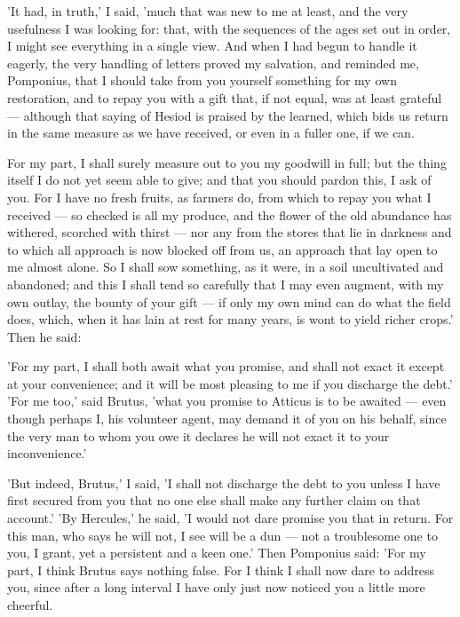  'It had, in truth,' I said, 'much that was new to me at least, and the very usefulness I was looking for: that, with the sequences of the ages set out in order, I might see everything in a single view. And when I had begun to handle it eagerly, the very handling of letters proved my salvation, and reminded me, Pomponius, that I should take from you yourself something for my own restoration, and to repay you with a gift that, if not equal, was at least grateful — although that saying of Hesiod is praised by the learned, which bids us return in the same measure as we have received, or even in a fuller one, if we can.

 For my part, I shall surely measure out to you my goodwill in full; but the thing itself I do not yet seem able to give; and that you should pardon this, I ask of you. For I have no fresh fruits, as farmers do, from which to repay you what I received — so checked is all my produce, and the flower of the old abundance has withered, scorched with thirst — nor any from the stores that lie in darkness and to which all approach is now blocked off from us, an approach that lay open to me almost alone. So I shall sow something, as it were, in a soil uncultivated and abandoned; and this I shall tend so carefully that I may even augment, with my own outlay, the bounty of your gift — if only my own mind can do what the field does, which, when it has lain at rest for many years, is wont to yield richer crops.' Then he said:

 'For my part, I shall both await what you promise, and shall not exact it except at your convenience; and it will be most pleasing to me if you discharge the debt.' 'For me too,' said Brutus, 'what you promise to Atticus is to be awaited — even though perhaps I, his volunteer agent, may demand it of you on his behalf, since the very man to whom you owe it declares he will not exact it to your inconvenience.'

 'But indeed, Brutus,' I said, 'I shall not discharge the debt to you unless I have first secured from you that no one else shall make any further claim on that account.' 'By Hercules,' he said, 'I would not dare promise you that in return. For this man, who says he will not, I see will be a dun — not a troublesome one to you, I grant, yet a persistent and a keen one.' Then Pomponius said: 'For my part, I think Brutus says nothing false. For I think I shall now dare to address you, since after a long interval I have only just now noticed you a little more cheerful.

